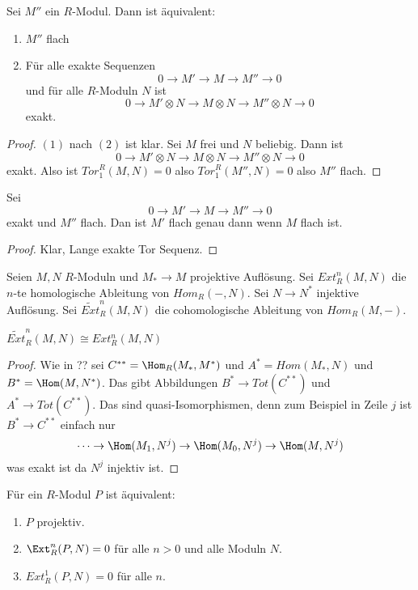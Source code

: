 \begin{Satz} Sei \(M''\) ein \(R\)-Modul. Dann ist äquivalent:
	\begin{enumerate}
		\item \(M''\) flach
		\item Für alle exakte Sequenzen \[0\to M'\to M\to M''\to 0\] und für alle \(R\)-Moduln \(N\) ist 
		\[0\to M'\otimes N\to M\otimes N\to M''\otimes N\to 0\] exakt.
	\end{enumerate}
	
\end{Satz}
\begin{proof}
	\((1)\) nach \((2)\) ist klar. Sei \(M\) frei und \(N\) beliebig.
	Dann ist \[0\to M'\otimes N\to M\otimes N\to M''\otimes N\to 0\] exakt.
	Also ist \(Tor_1^R(M,N)=0\) also \(Tor_1^R(M'',N)=0\) also \(M''\) flach.
\end{proof}
\begin{Satz} Sei \[0\to M'\to M\to M''\to 0\] exakt und \(M''\) flach.
	Dan ist \(M'\) flach genau dann wenn \(M\) flach ist.
	
\end{Satz}
\begin{proof}
	Klar, Lange exakte Tor Sequenz.
\end{proof}
\begin{Def} Seien \(M,N\) \(R\)-Moduln und \(M_*\to M\) projektive Auflösung.
	Sei \(Ext_R^n(M,N)\) die \(n\)-te homologische Ableitung von \(Hom_R(-,N)\). 
	Sei  \(N\to N^*\) injektive Auflösung. Sei \(\tilde{Ext}_R^n(M,N)\) die cohomologische Ableitung von \(Hom_R(M,-)\). 
	
\end{Def}
\begin{Satz} \(\tilde{Ext}_R^n(M,N)\cong Ext_R^n(M,N)\)
	
\end{Satz}
\begin{proof}
	Wie in ?? sei \(C^{**}=\Hom_R(M_*,M^*)\) und \(A^*=Hom(M_*,N)\) und \(B^*=\Hom(M,N^*)\).
	Das gibt Abbildungen \(B^*\to Tot(C^{**})\) und \(A^*\to Tot(C^{**})\). Das sind quasi-Isomorphismen, denn zum
	Beispiel in Zeile \(j\) ist \(B^*\to C^{**}\) einfach nur 
	\[\dots\to\Hom(M_1,N^j)\to\Hom(M_0,N^j)\to\Hom(M,N^j)\] was exakt ist da \(N^j\) injektiv ist.
\end{proof}
\begin{Satz} Für ein \(R\)-Modul \(P\) ist äquivalent:
	\begin{enumerate}
		\item \(P\) projektiv.
		\item \(\Ext_R^n(P,N)=0\) für alle \(n>0\) und alle Moduln \(N\).
		\item \(Ext_R^1(P,N)=0\) für alle \(n\).
	\end{enumerate}
	
\end{Satz}
